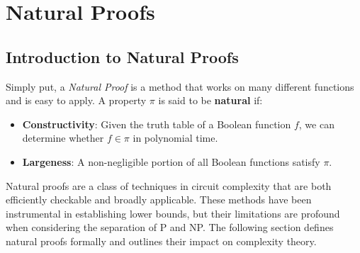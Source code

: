\documentclass[12pt]{report}
\begin{document}
\newpage
\chapter{Natural Proofs}
\section{Introduction to Natural Proofs}
Simply put, a \textit{Natural Proof} is a method that works on many different functions and is easy to apply.  
A property $\mathcal{\pi}$ is said to be \textbf{natural} if:
\begin{itemize}
    \item \textbf{Constructivity}: Given the truth table of a Boolean function $f$, we can determine whether $f \in \mathcal{\pi}$ in polynomial time.
    \item \textbf{Largeness}: A non-negligible portion of all Boolean functions satisfy $\mathcal{\pi}$.
\end{itemize}

Natural proofs are a class of techniques in circuit complexity that are both efficiently checkable and broadly applicable. These methods have been instrumental in establishing lower bounds, but their limitations are profound when considering the separation of P and NP. The following section defines natural proofs formally and outlines their impact on complexity theory.
\end{document}
